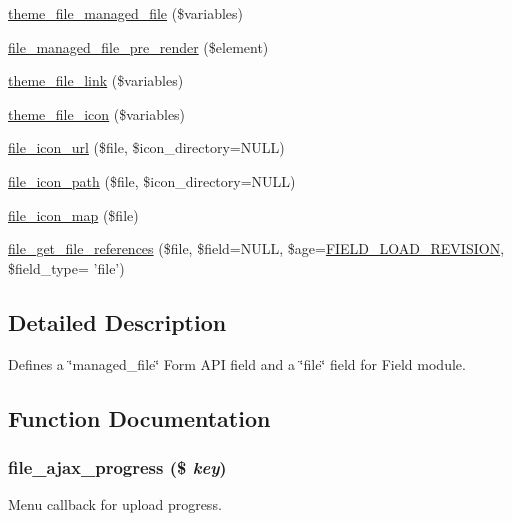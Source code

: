 \begin{DoxyCompactItemize}
\item 
\hyperlink{group__themeable_ga4a224a07d1150f036feea621eb99fbe5}{theme\_\-file\_\-managed\_\-file} (\$variables)
\item 
\hyperlink{file_8module_a0e548196b69cc1d2354b468348d514cf}{file\_\-managed\_\-file\_\-pre\_\-render} (\$element)
\item 
\hyperlink{group__themeable_ga09a17231e69397fafde06db8db4f476f}{theme\_\-file\_\-link} (\$variables)
\item 
\hyperlink{group__themeable_ga7807f8ee7d081b9d1f7a9f96f7b0a52c}{theme\_\-file\_\-icon} (\$variables)
\item 
\hyperlink{file_8module_ad4fcd7650077b4fa3d08812c30806ed5}{file\_\-icon\_\-url} (\$file, \$icon\_\-directory=NULL)
\item 
\hyperlink{file_8module_a567cc64128c525052f215ebe1a2b5dd8}{file\_\-icon\_\-path} (\$file, \$icon\_\-directory=NULL)
\item 
\hyperlink{file_8module_a469ff5325a9180869170a3b9b09e09ea}{file\_\-icon\_\-map} (\$file)
\item 
\hyperlink{group__file_gad391f02fb9f97bad982b7f66c1ce54d0}{file\_\-get\_\-file\_\-references} (\$file, \$field=NULL, \$age=\hyperlink{group__field_ga6eae4d17256be446f837da1a360f0096}{FIELD\_\-LOAD\_\-REVISION}, \$field\_\-type= 'file')
\end{DoxyCompactItemize}


\subsection{Detailed Description}
Defines a \char`\"{}managed\_\-file\char`\"{} Form API field and a \char`\"{}file\char`\"{} field for Field module. 

\subsection{Function Documentation}
\hypertarget{file_8module_a97ec958e5f2329df3e66fbf0ca41abab}{
\subsubsection[{file\_\-ajax\_\-progress}]{\setlength{\rightskip}{0pt plus 5cm}file\_\-ajax\_\-progress (\$ {\em key})}}
\label{file_8module_a97ec958e5f2329df3e66fbf0ca41abab}
Menu callback for upload progress.


